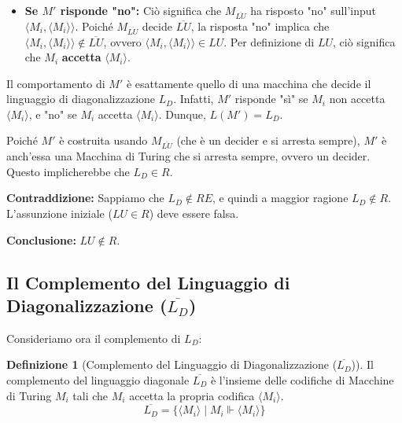 \documentclass[a4paper]{article}
\makeatletter
\theoremstyle{definition} %
\newtheorem{definition}{Definizione}[section] %
\renewenvironment{proof}[1][\proofname]{\par
  \pushQED{\qed}%
  \normalfont \topsep6\p@\@plus6\p@\relax
  \trivlist
  \item[\hskip\labelsep
        \bfseries
    #1\@addpunct{.}]\ignorespaces
}{%
  \popQED\endtrivlist\@endpefalse
}
\makeatother
\begin{document}
\begin{proof}
\begin{itemize}
    Poiché $M_{\overline{LU}}$ decide $\overline{LU}$, la risposta "sì" implica che $\langle M_i, \langle M_i \rangle \rangle \in \overline{LU}$.
    Per definizione di $\overline{LU}$, ciò significa che $M_i$ \textbf{non accetta} $\langle M_i \rangle$.
    \item \textbf{Se $M'$ risponde "no":}
    Ciò significa che $M_{\overline{LU}}$ ha risposto "no" sull'input $\langle M_i, \langle M_i \rangle \rangle$.
    Poiché $M_{\overline{LU}}$ decide $\overline{LU}$, la risposta "no" implica che $\langle M_i, \langle M_i \rangle \rangle \notin \overline{LU}$, ovvero $\langle M_i, \langle M_i \rangle \rangle \in LU$.
    Per definizione di $LU$, ciò significa che $M_i$ \textbf{accetta} $\langle M_i \rangle$.
\end{itemize}
Il comportamento di $M'$ è esattamente quello di una macchina che decide il linguaggio di diagonalizzazione $L_D$. Infatti, $M'$ risponde "sì" se $M_i$ non accetta $\langle M_i \rangle$, e "no" se $M_i$ accetta $\langle M_i \rangle$. Dunque, $L(M') = L_D$.

Poiché $M'$ è costruita usando $M_{\overline{LU}}$ (che è un decider e si arresta sempre), $M'$ è anch'essa una Macchina di Turing che si arresta sempre, ovvero un decider. Questo implicherebbe che $L_D \in R$.

\textbf{Contraddizione:} Sappiamo che $L_D \notin RE$, e quindi a maggior ragione $L_D \notin R$.
L'assunzione iniziale ($LU \in R$) deve essere falsa.

\textbf{Conclusione:} $LU \notin R$.
\end{proof}

\subsection{Il Complemento del Linguaggio di Diagonalizzazione ($\overline{L_D}$)}
Consideriamo ora il complemento di $L_D$:
\begin{definition}[Complemento del Linguaggio di Diagonalizzazione ($\overline{L_D}$)]
Il complemento del linguaggio diagonale $\overline{L_D}$ è l'insieme delle codifiche di Macchine di Turing $M_i$ tali che $M_i$ accetta la propria codifica $\langle M_i \rangle$.
\[ \overline{L_D} = \{ \langle M_i \rangle \mid M_i \Vdash \langle M_i \rangle \} \]
\end{definition}
\end{document}
